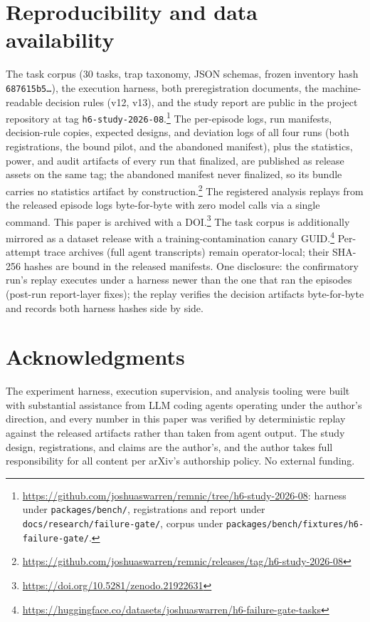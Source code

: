 \documentclass[11pt]{article}
\begin{document}
\section{Reproducibility and data availability}
\label{sec:repro}

The task corpus (30 tasks, trap taxonomy, JSON schemas, frozen inventory hash
\texttt{687615b5\ldots}), the execution harness, both preregistration
documents, the machine-readable decision rules (v12, v13), and the study
report are public in the project repository at tag
\texttt{h6-study-2026-08}.\footnote{\url{https://github.com/joshuaswarren/remnic/tree/h6-study-2026-08}:
harness under \texttt{packages/bench/}, registrations and report under
\texttt{docs/research/failure-gate/}, corpus under
\texttt{packages/bench/fixtures/h6-failure-gate/}.} The per-episode logs,
run manifests, decision-rule copies, expected designs, and deviation logs of
all four runs (both registrations, the bound pilot, and the abandoned
manifest), plus the statistics, power, and audit artifacts of every run that
finalized, are published as release assets on the same tag; the abandoned
manifest never finalized, so its bundle carries no statistics artifact by
construction.\footnote{\url{https://github.com/joshuaswarren/remnic/releases/tag/h6-study-2026-08}}
The registered analysis replays from the released episode logs byte-for-byte
with zero model calls via a single command. This paper is archived with a
DOI.\footnote{\url{https://doi.org/10.5281/zenodo.21922631}} The task
corpus is additionally mirrored as a dataset release with a
training-contamination canary
GUID.\footnote{\url{https://huggingface.co/datasets/joshuaswarren/h6-failure-gate-tasks}}
Per-attempt trace archives (full agent transcripts) remain operator-local;
their SHA-256 hashes are bound in the released manifests. One disclosure: the confirmatory run's replay executes under
a harness newer than the one that ran the episodes (post-run report-layer
fixes); the replay verifies the decision artifacts byte-for-byte and records
both harness hashes side by side.

\section*{Acknowledgments}
The experiment harness, execution supervision, and analysis tooling were
built with substantial assistance from LLM coding agents operating under the
author's direction, and every number in this paper was verified by
deterministic replay against the released artifacts rather than taken from
agent output. The study design, registrations, and claims are the author's, and the
author takes full responsibility for all content per arXiv's authorship
policy. No external funding.
\end{document}
